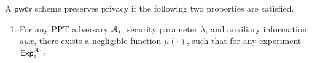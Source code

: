 


\begin{definition}[Privacy]\label{def-a::privacy} A $\mathsf{pwdr}$ scheme preserves privacy if  the following two properties are satisfied.
\begin{enumerate}[leftmargin=*]

\item For any PPT  adversary $\mathcal{A}_{\scriptscriptstyle 1}$,  security parameter $\lambda$, and  auxiliary information $aux$, there exists a negligible function $\mu(\cdot)$, such that for any  experiment $\mathsf{Exp}_{\scriptscriptstyle 3}^{\mathcal{A}_{\scriptscriptstyle 1}}$:



\end{enumerate}
\end{definition}
